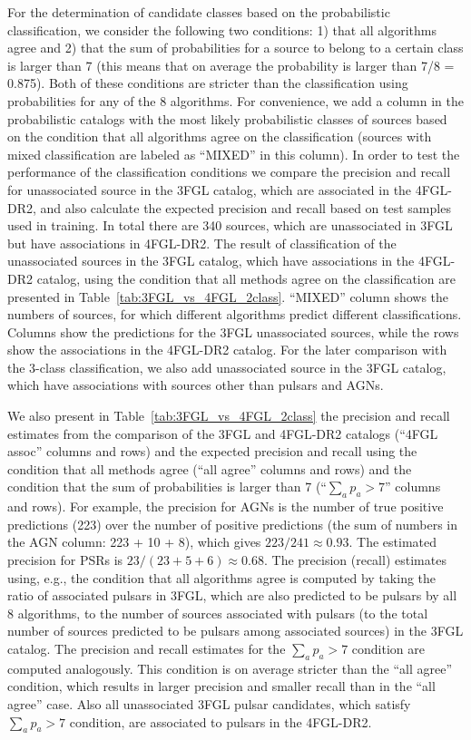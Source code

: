 For the determination of candidate classes based on the probabilistic classification, we consider the following two conditions:
1) that all algorithms agree and 
2) that the sum of probabilities for a source to belong to a certain class is larger than 7 
(this means that on average the probability is larger than 7/8 = 0.875).
Both of these conditions are stricter than the classification using probabilities for any of the 8 algorithms.
For convenience, we add a column in the probabilistic catalogs with the most likely probabilistic classes of sources based on the condition that all algorithms agree on the classification (sources with mixed classification are labeled as ``MIXED'' in this column).
In order to test the performance of the classification conditions we compare the precision and recall for unassociated source in the 3FGL catalog, which are associated in the 4FGL-DR2, and also calculate the expected precision and recall based on
test samples used in training.
In total there are 340 sources, which are unassociated in 3FGL but have associations in 4FGL-DR2.
The result of classification of the unassociated sources in the 3FGL catalog, which have associations in the 4FGL-DR2 catalog, 
using the condition that all methods agree on the classification are presented in Table~\ref{tab:3FGL_vs_4FGL_2class}.
``MIXED'' column shows the numbers of sources, for which different algorithms predict different classifications.
Columns show the predictions for the 3FGL unassociated sources, while the rows show the associations in the 4FGL-DR2 catalog.
For the later comparison with the 3-class classification, we also add unassociated source in the 3FGL catalog, 
which have associations with sources other than pulsars and AGNs.

We also present in Table~\ref{tab:3FGL_vs_4FGL_2class} the precision and recall estimates from the comparison of the 3FGL and 4FGL-DR2 catalogs (``4FGL assoc'' columns and rows) and the expected precision and recall using the condition that all
methods agree (``all agree'' columns and rows) and the condition that the sum of probabilities is larger than 7 (``$\sum_a p_a > 7$'' columns and rows).
For example, the precision for AGNs is the number of true positive predictions (223) over the number of positive predictions (the sum of numbers in the AGN column: 223 + 10 + 8), which gives $223 / 241 \approx 0.93$.
The estimated precision for PSRs is $ 23 / (23 + 5 + 6) \approx 0.68$.
The precision (recall) estimates using, e.g., the condition that all algorithms agree is computed by taking the ratio of associated pulsars in 3FGL, which are also predicted to be pulsars by all 8 algorithms, to the number of sources associated with pulsars (to the total number of sources predicted to be pulsars among associated sources) in the 3FGL catalog.
The precision and recall estimates for the $\sum_a p_a > 7$ condition are computed analogously.
This condition is on average stricter than the ``all agree'' condition, which results in larger precision and smaller recall than in the ``all agree'' case.
Also all unassociated 3FGL pulsar candidates, which satisfy $\sum_a p_a > 7$ condition, are associated to pulsars in the 4FGL-DR2.

